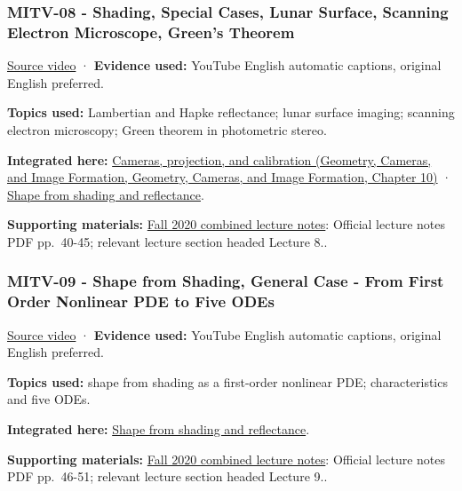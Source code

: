 \subsubsection{MITV-08 - Shading, Special Cases, Lunar Surface, Scanning Electron Microscope, Green's Theorem}\label{04-visual-computing-ii-ch036-mitv-08---shading-special-cases-lunar-surface-scanning-electron-microscope-greens-theorem}

\href{https://www.youtube.com/watch?v=LP7z6vVmnms}{Source video} · \textbf{Evidence used:} YouTube English automatic captions, original English preferred.

\textbf{Topics used:} Lambertian and Hapke reflectance; lunar surface imaging; scanning electron microscopy; Green theorem in photometric stereo.

\textbf{Integrated here:} \href{../03-Geometry-Cameras-and-Image-Formation/main.pdf\#nameddest=03-visual-computing-i-ch003-cameras-projection-and-calibration}{Cameras, projection, and calibration (Geometry, Cameras, and Image Formation, Geometry, Cameras, and Image Formation, Chapter 10)} · \hyperref[04-visual-computing-ii-ch032-shape-from-shading-and-reflectance]{Shape from shading and reflectance}.

\textbf{Supporting materials:} \href{https://ocw.mit.edu/courses/6-801-machine-vision-fall-2020/9ec44f69e72995c370b3797818ba01e6_MIT6_801F20_lectureNotes.pdf}{Fall 2020 combined lecture notes}: Official lecture notes PDF pp.~40-45; relevant lecture section headed Lecture 8..

\subsubsection{MITV-09 - Shape from Shading, General Case - From First Order Nonlinear PDE to Five ODEs}\label{04-visual-computing-ii-ch036-mitv-09---shape-from-shading-general-case---from-first-order-nonlinear-pde-to-five-odes}

\href{https://www.youtube.com/watch?v=J4gbaRyWpoM}{Source video} · \textbf{Evidence used:} YouTube English automatic captions, original English preferred.

\textbf{Topics used:} shape from shading as a first-order nonlinear PDE; characteristics and five ODEs.

\textbf{Integrated here:} \hyperref[04-visual-computing-ii-ch032-shape-from-shading-and-reflectance]{Shape from shading and reflectance}.

\textbf{Supporting materials:} \href{https://ocw.mit.edu/courses/6-801-machine-vision-fall-2020/9ec44f69e72995c370b3797818ba01e6_MIT6_801F20_lectureNotes.pdf}{Fall 2020 combined lecture notes}: Official lecture notes PDF pp.~46-51; relevant lecture section headed Lecture 9..


